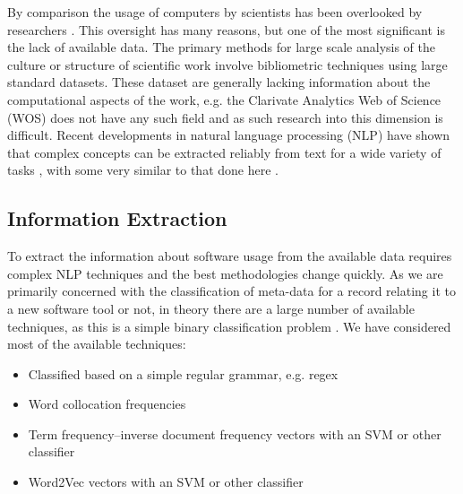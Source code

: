 \documentclass[12pt, a4paper]{article}
\begin{document}
By comparison the usage of computers by scientists has been overlooked by researchers \citep{sloanrep}. This oversight has many reasons, but one of the most significant is the lack of available data. The primary methods for large scale analysis of the culture or structure of scientific work involve bibliometric techniques \citep{de2009bibliometrics} using large standard datasets\citep[e.g.][]{Boyack2005, borner2010atlas, borner2015atlas, sugimoto2013global, shi2015weaving, evans_meta, skupin2013visualizing}. These dataset are generally lacking information about the computational aspects of the work, e.g. the  Clarivate Analytics Web of Science (WOS) does not have any such field \citep{mkdocs} and as such research into this dimension is difficult. Recent developments in natural language processing (NLP) have shown that complex concepts can be extracted reliably from text for a wide variety of tasks \citep{evans2016machine}, with some very similar to that done here \citep{foster2015tradition}.

\subsection{Information Extraction}

To extract the information about software usage from the available data requires complex NLP techniques and the best methodologies change quickly\citep{evans2016machine}. As we are primarily concerned with the classification of meta-data for a record relating it to a new software tool or not, in theory there are a large number of available techniques, as this is a simple binary classification problem \citep{james2013introduction}\citep{jurafsky2000speech}\citep{murphy2012machine}. We have considered most of the available techniques:

\begin{itemize}
\item Classified based on a simple regular grammar, e.g. regex
\item Word collocation frequencies \citep{manning1999foundations}
\item Term frequency–inverse document frequency vectors with an SVM or other classifier \citep{collobert2011natural}
\item Word2Vec vectors with an SVM or other classifier\citep{mikolov2013distributed}\citep{collobert2011natural}
\end{itemize}
\end{document}
